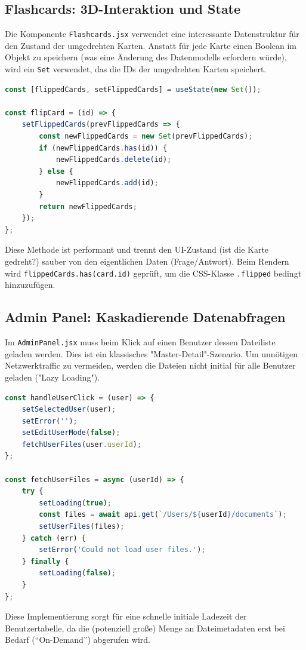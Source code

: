 \subsection{Flashcards: 3D-Interaktion und State}
Die Komponente \texttt{Flashcards.jsx} verwendet eine interessante Datenstruktur für den Zustand der umgedrehten Karten. Anstatt für jede Karte einen Boolean im Objekt zu speichern (was eine Änderung des Datenmodells erfordern würde), wird ein \texttt{Set} verwendet, das die IDs der umgedrehten Karten speichert.

\begin{lstlisting}[language=JavaScript, caption={Nutzung eines Sets für UI-State}]
const [flippedCards, setFlippedCards] = useState(new Set());

const flipCard = (id) => {
    setFlippedCards(prevFlippedCards => {
        const newFlippedCards = new Set(prevFlippedCards);
        if (newFlippedCards.has(id)) {
            newFlippedCards.delete(id);
        } else {
            newFlippedCards.add(id);
        }
        return newFlippedCards;
    });
};
\end{lstlisting}

Diese Methode ist performant und trennt den UI-Zustand (ist die Karte gedreht?) sauber von den eigentlichen Daten (Frage/Antwort). Beim Rendern wird \texttt{flippedCards.has(card.id)} geprüft, um die CSS-Klasse \texttt{.flipped} bedingt hinzuzufügen.
\newpage

\subsection{Admin Panel: Kaskadierende Datenabfragen}
Im \texttt{AdminPanel.jsx} muss beim Klick auf einen Benutzer dessen Dateiliste geladen werden. Dies ist ein klassisches "Master-Detail"-Szenario.
Um unnötigen Netzwerktraffic zu vermeiden, werden die Dateien nicht initial für alle Benutzer geladen ("Lazy Loading").

\begin{lstlisting}[language=JavaScript, caption={Asynchrones Laden von Detaildaten}]
const handleUserClick = (user) => {
    setSelectedUser(user);
    setError('');
    setEditUserMode(false);
    fetchUserFiles(user.userId);
};

const fetchUserFiles = async (userId) => {
    try {
        setLoading(true);
        const files = await api.get(`/Users/${userId}/documents`);
        setUserFiles(files);
    } catch (err) {
        setError('Could not load user files.');
    } finally {
        setLoading(false);
    }
};
\end{lstlisting}

Diese Implementierung sorgt für eine schnelle initiale Ladezeit der Benutzertabelle, da die (potenziell große) Menge an Dateimetadaten erst bei Bedarf ("`On-Demand"') abgerufen wird.
\newpage
